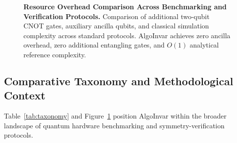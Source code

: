 \documentclass[aps,pra,reprint,superscriptaddress,floatfix,nofootinbib]{revtex4-2}
\begin{document}
\begin{figure}[t]
{%
}
\caption{\textbf{Resource Overhead Comparison Across Benchmarking and Verification Protocols.} 
Comparison of additional two-qubit CNOT gates, auxiliary ancilla qubits, and classical simulation complexity across standard protocols. AlgoInvar achieves zero ancilla overhead, zero additional entangling gates, and $O(1)$ analytical reference complexity.}
\label{fig:method_comparison}
\end{figure}

\subsection{Comparative Taxonomy and Methodological Context}
Table~\ref{tab:taxonomy} and Figure~\ref{fig:method_comparison} position AlgoInvar within the broader landscape of quantum hardware benchmarking and symmetry-verification protocols. 
\end{document}
